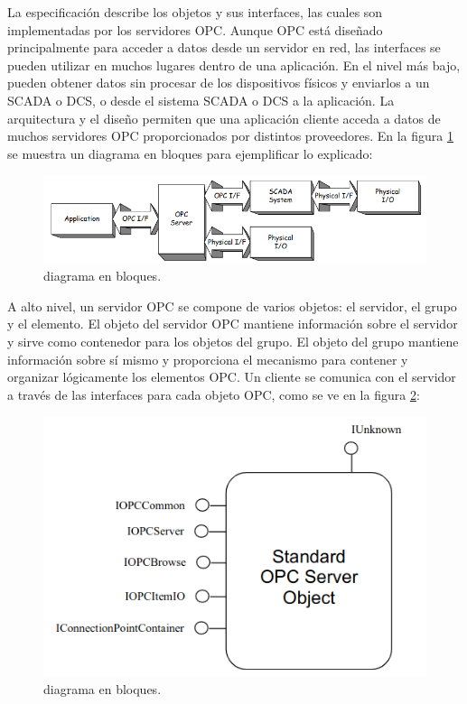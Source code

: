 La especificación describe los objetos y sus interfaces, las cuales son implementadas por los servidores OPC. Aunque OPC está diseñado principalmente para acceder a datos desde un servidor en red, las interfaces se pueden utilizar en muchos lugares dentro de una aplicación. En el nivel más bajo, pueden obtener datos sin procesar de los dispositivos físicos y enviarlos a un SCADA o DCS, o desde el sistema SCADA o DCS a la aplicación. La arquitectura y el diseño permiten que una aplicación cliente acceda a datos de muchos servidores OPC proporcionados por distintos proveedores. En la figura \ref{fig:OPCbloques} se muestra un diagrama en bloques para ejemplificar lo explicado:

\begin{figure}[htpb]
	\centering
	\includegraphics[scale=0.4]{./Figures/opc_2.png}
	\caption{diagrama en bloques\protect\footnotemark.}
	\label{fig:OPCbloques}
\end{figure}


A alto nivel, un servidor OPC se compone de varios objetos: el servidor, el grupo y el elemento. El objeto del servidor OPC mantiene información sobre el servidor y sirve como contenedor para los objetos del grupo. El objeto del grupo mantiene información sobre sí mismo y proporciona el mecanismo para contener y organizar lógicamente los elementos OPC. Un cliente se comunica con el servidor a través de las interfaces para cada objeto OPC, como se ve en la figura \ref{fig:OPCapi}:

\begin{figure}[htpb]
	\centering
	\includegraphics[scale=0.4]{./Figures/opc_3.png}
	\caption{diagrama en bloques\protect\footnotemark.}
	\label{fig:OPCapi}
\end{figure}

